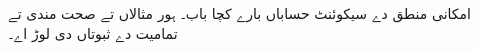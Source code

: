 \documentclass[../../../include/open-logic-chapter]{subfiles}
\begin{document}
\begin{editorial}
  امکانی منطق دے سیکوئنٹ حساباں بارے کچا باب۔ ہور مثالاں تے صحت مندی
  تے تمامیت دے ثبوتاں دی لوڑ اے۔
\end{editorial}


\OLEndChapterHook
\end{document}
